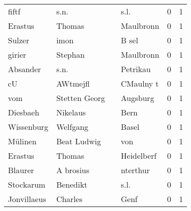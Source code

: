 \begin{tabular}{llllrr}
                    fiftf &                               s.n. &             &                                        s.l. &          0 &         1 \\
                  Erastus &                             Thomas &             &                                   Maulbronn &          0 &         1 \\
                   Sulzer &                               imon &             &                                       B sel &          0 &         1 \\
                   girier &                            Stephan &             &                                   Maulbronn &          0 &         1 \\
                 Absander &                               s.n. &             &                                    Petrikau &          0 &         1 \\
                       cU &                           AWtmejfl &             &                                   CMaulny t &          0 &         1 \\
                      vom &                      Stetten Georg &             &                                    Augsburg &          0 &         1 \\
                 Diesbaeh &                           Nikelaus &             &                                        Bern &          0 &         1 \\
               Wissenburg &                           Welfgang &             &                                       Basel &          0 &         1 \\
                  Mülinen &                        Beat Ludwig &             &                                         von &          0 &         1 \\
                  Erastus &                             Thomas &             &                                  Heidelberf &          0 &         1 \\
                  Blaurer &                          A brosius &             &                                    nterthur &          0 &         1 \\
                Stockarum &                           Benedikt &             &                                        s.l. &          0 &         1 \\
              Jonvillaeus &                            Charles &             &                                        Genf &          0 &         1 \\

\end{tabular}
